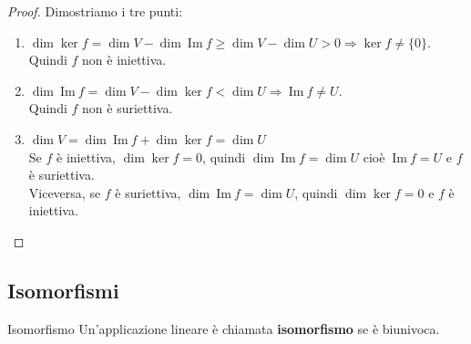 \documentclass[a4paper]{article}
\newcommand{\IM}{\ \mathrm{Im} \ }
\theoremstyle{definition}
\begin{document}
\begin{proof}
	Dimostriamo i tre punti:
	\begin{enumerate}
		\item $\dim \ker f = \dim V - \dim \IM f \ge \dim V - \dim U > 0 \Rightarrow \ker f \ne \{0\}$. \\
		      Quindi $f$ non è iniettiva.
		\item $\dim \IM f = \dim V - \dim \ker f < \dim U \Rightarrow \IM f \ne U$. \\
		      Quindi $f$ non è suriettiva.
		\item $\dim V = \dim \IM f + \dim \ker f = \dim U$ \\
		      Se $f$ è iniettiva, $\dim \ker f = 0$, quindi $\dim \IM f = \dim U$ cioè $\IM f = U$ e $f$ è suriettiva. \\
			  Viceversa, se $f$ è suriettiva, $\dim \IM f = \dim U$, quindi $\dim \ker f = 0$ e $f$ è iniettiva.
	\end{enumerate}
\end{proof}

\subsection{Isomorfismi}
\begin{deff}{Isomorfismo}{}
	Un'applicazione lineare è chiamata \textbf{isomorfismo} se è biunivoca.
\end{deff}
\end{document}
